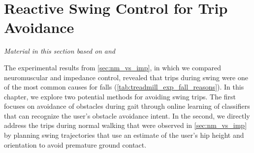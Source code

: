 \chapter{Reactive Swing Control for Trip Avoidance}\label{sec:trip_avoidance}
\graphicspath{{chapters/trip_avoidance/figures/}}

\emph{Material in this section based on}
\citet{gordon2019online}\cite{gordon2019online} \emph{and}
\citet{thatte2019realtime}\cite{thatte2019realtime} \linebreak

The experimental results from \cref{sec:nm_vs_imp}, in which we compared
neuromuscular and impedance control, revealed that trips during swing were one
of the most common causes for falls (\cref{tab:treadmill_exp_fall_reasons}). In
this chapter, we explore two potential methods for avoiding swing trips. The
first focuses on avoidance of obstacles during gait through online learning of
classifiers that can recognize the user's obstacle avoidance intent. In the
second, we directly address the trips during normal walking that were observed
in \cref{sec:nm_vs_imp} by planning swing trajectories that use an estimate of
the user's hip height and orientation to avoid premature ground contact.









